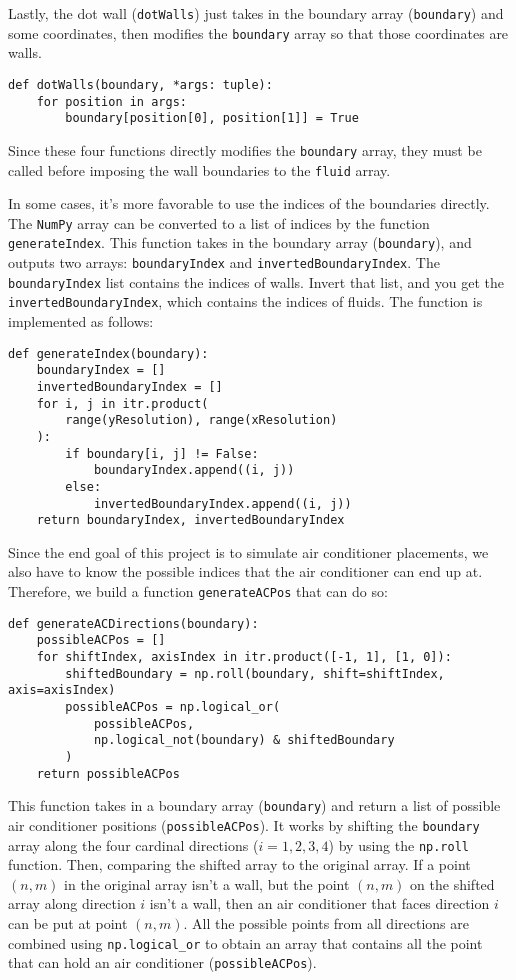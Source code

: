 Lastly, the dot wall (\texttt{dotWalls}) just takes in the boundary array (\texttt{boundary}) and some coordinates, then modifies the \texttt{boundary} array so that those coordinates are walls.
\begin{verbatim}
def dotWalls(boundary, *args: tuple):
    for position in args:
        boundary[position[0], position[1]] = True
\end{verbatim}

Since these four functions directly modifies the \texttt{boundary} array, they must be called before imposing the wall boundaries to the \texttt{fluid} array.

In some cases, it's more favorable to use the indices of the boundaries directly. The \texttt{NumPy} array can be converted to a list of indices by the function \texttt{generateIndex}. This function takes in the boundary array (\texttt{boundary}), and outputs two arrays: \texttt{boundaryIndex} and \texttt{invertedBoundaryIndex}. The \texttt{boundaryIndex} list contains the indices of walls. Invert that list, and you get the \texttt{invertedBoundaryIndex}, which contains the indices of fluids. The function is implemented as follows:
\begin{verbatim}
def generateIndex(boundary):
    boundaryIndex = []
    invertedBoundaryIndex = []
    for i, j in itr.product(
        range(yResolution), range(xResolution)
    ):
        if boundary[i, j] != False:
            boundaryIndex.append((i, j))
        else:
            invertedBoundaryIndex.append((i, j))
    return boundaryIndex, invertedBoundaryIndex
\end{verbatim}

Since the end goal of this project is to simulate air conditioner placements, we also have to know the possible indices that the air conditioner can end up at. Therefore, we build a function \texttt{generateACPos} that can do so:
\begin{verbatim}
def generateACDirections(boundary):
    possibleACPos = []
    for shiftIndex, axisIndex in itr.product([-1, 1], [1, 0]):
        shiftedBoundary = np.roll(boundary, shift=shiftIndex, axis=axisIndex)
        possibleACPos = np.logical_or(
            possibleACPos,
            np.logical_not(boundary) & shiftedBoundary
        )
    return possibleACPos
\end{verbatim}
This function takes in a boundary array (\texttt{boundary}) and return a list of possible air conditioner positions (\texttt{possibleACPos}). It works by shifting the \texttt{boundary} array along the four cardinal directions ($i = 1, 2, 3, 4$) by using the \texttt{np.roll} function. Then, comparing the shifted array to the original array. If a point $(n, m)$ in the original array isn't a wall, but the point $(n, m)$ on the shifted array along direction $i$ isn't a wall, then an air conditioner that faces direction $i$ can be put at point $(n, m)$. All the possible points from all directions are combined using \texttt{np.logical\_or} to obtain an array that contains all the point that can hold an air conditioner (\texttt{possibleACPos}).

